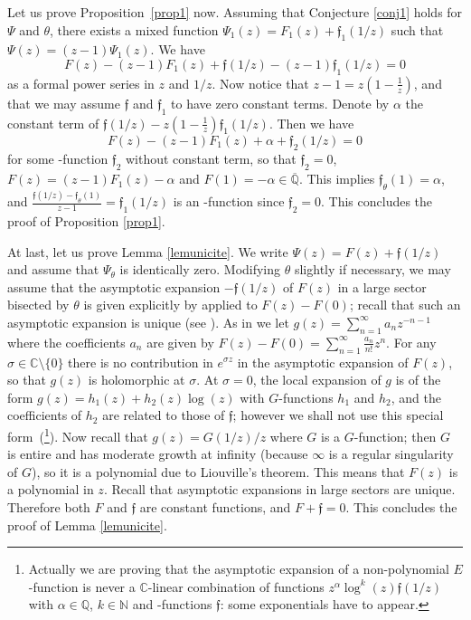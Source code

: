 \documentclass[reqno,12pt]{article}
\numberwithin{equation}{section}
\theoremstyle{remark}
\newcommand{\N}{\mathbb{N}}
\newcommand{\Q}{\mathbb{Q}}
\renewcommand{\C}{\mathbb{C}}
\newcommand{\Qbar}{\overline{\mathbb Q}}
\newcommand{\tantie}{\foreignlanguage{russian}{\CYREREV}}
\newcommand{\antie}{\text{\tantie}}
\newcommand{\fgo}{\mathfrak{f}}
\begin{document}
\bigskip

Let us prove Proposition~\ref{prop1} now.  Assuming that Conjecture \ref{conj1} holds for $\Psi$ and $\theta$, there exists a mixed function $ \Psi_1(z)=F_1(z)+\fgo_1(1/z)$ such that $ \Psi(z) =(z-1)\Psi_1(z)$. 
We have
\begin{equation}\label{eqpreuvelem}
 F(z)-(z-1) F_1(z)+  \fgo (1/z) - (z-1)  \fgo_{1} (1/z)  = 0
 \end{equation}
as a formal power series in $z$ and $1/z$.
 Now notice that $z-1 = z(1-\frac1z)$, and  that we may assume   $\fgo $ and $\fgo_{1 }$ to have zero constant terms.
Denote by $\alpha $ the constant term of  $ \fgo (1/z) -  z(1-\frac1z) \fgo_{1}(1/z)$. Then we have 
$$  F(z)-(z-1) F_1(z)+ \alpha + \fgo_{2}(1/z)  =0$$
for some  \antie-function $\fgo_{2}$  without constant term, so that $\fgo_{2 } = 0$,  $ F(z) = (z-1) F_1(z)-  \alpha $ and $F(1) = -  \alpha\in\Qbar$.  This implies $\fgo_\theta(1) =   \alpha$, and  $\frac{  \fgo(1/z)  - \fgo_\theta(1) }{z-1}  =\fgo_{1 } (1/z) $ is an \antie-function since $\fgo_{2 } = 0$.
This  concludes the proof of Proposition \ref{prop1}.


\bigskip

At last, let us prove Lemma \ref{lemunicite}.
 We write  $\Psi(z) = F(z)+\fgo(1/z)$ and assume that $\Psi_\theta$ is identically zero.
Modifying $\theta$ slightly if necessary, we may assume that the asymptotic expansion $-\fgo(1/z)$ of $F(z)$ in a  large sector bisected by $\theta$ is given explicitly by \cite[Theorem~5]{ateo} applied to $F(z)-F(0)$; recall that such an asymptotic expansion is unique (see   \cite{ateo}). As in \cite{ateo} we let $g(z) = \sum_{n=1}^\infty a_n z^{-n-1}$ where the coefficients $a_n$ are given by $F(z)-F(0)= \sum_{n=1}^\infty \frac{a_n}{n!} z^n$.   For any $\sigma \in \C \setminus \{  0 \}$ there is no contribution in $e^{\sigma z}$ in the asymptotic expansion of $F(z)$, so that $g(z)$ is holomorphic at $\sigma$. At $\sigma=0$, the local expansion of $g$ is of the form $g(z) = h_1(z) +  h_2(z)\log(z)$ with $G$-functions $h_1$ and $h_2$, and  the coefficients of $h_2$ are related to those of $\fgo$; however we shall not use this special form~(\footnote{Actually we are proving that the asymptotic expansion of a non-polynomial $E$-function is never a $\C$-linear combination of functions $z^\alpha \log^k(z) \fgo(1/z)$ with $\alpha\in\Q$, $k\in\N$ and \antie-functions $\fgo$: some exponentials have to appear.}). Now recall that $g(z) = G(1/z)/z$ where $G$ is a $G$-function; then $G$ is entire and   has moderate growth at infinity (because $\infty$ is a regular singularity of $G$), so  it is a polynomial due to Liouville's theorem. This means that $F(z)$ is a polynomial in $z$. Recall that  asymptotic expansions in large sectors are unique. Therefore both $F$ and  $\fgo   $ are  constant functions, and $F+\fgo=0$. This concludes the proof of Lemma \ref{lemunicite}.
 
\end{document}
